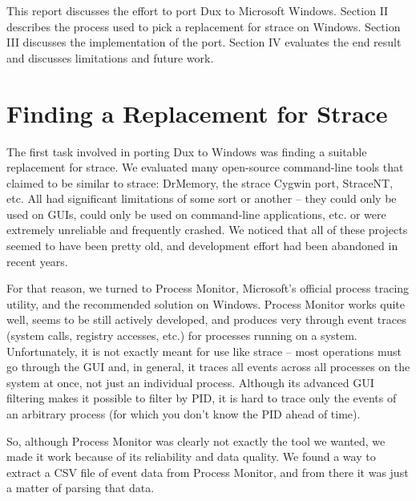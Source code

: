 \documentclass[10pt,conference]{IEEEtran}
\begin{document}
This report discusses the effort to port Dux to Microsoft Windows. Section II
describes the process used to pick a replacement for strace on Windows. Section 
III discusses the implementation of the port. Section IV evaluates the end result
and discusses limitations and future work.

\section{Finding a Replacement for Strace} 

The first task involved in porting Dux to Windows was finding a suitable replacement
for strace. We evaluated many open-source command-line tools that claimed to be
similar to strace: DrMemory, the strace Cygwin port, StraceNT, etc. All had significant
limitations of some sort or another -- they could only be used on GUIs, could only be
used on command-line applications, etc. or were extremely unreliable and frequently
crashed. We noticed that all of these projects seemed to have been pretty old,
and development effort had been abandoned in recent years.

For that reason, we turned to Process Monitor, Microsoft's official process tracing 
utility, and the recommended solution on Windows. Process Monitor works quite well,
seems to be still actively developed, and produces very through event traces (system calls, 
registry accesses, etc.) for processes running on a system. Unfortunately, it is not
exactly meant for use like strace -- most operations must go through the GUI and,
in general, it traces all events across all processes on the system at once, not just 
an individual process. Although its advanced GUI filtering makes it possible to
filter by PID, it is hard to trace only the events of an arbitrary process (for
which you don't know the PID ahead of time).

So, although Process Monitor was clearly not exactly the tool we wanted, we made
it work because of its reliability and data quality. We found a way to extract a 
CSV file of event data from Process Monitor, and from there it was just a matter 
of parsing that data.
\end{document}
